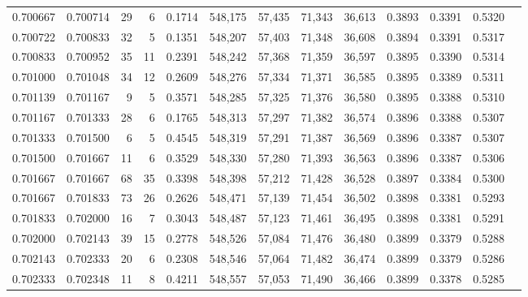 \begin{tabular}{rrrrrrrrrrrrr}
0.700667 & 0.700714 &    29 &   6 &                                     0.1714 & 548,175 &  57,435 &  71,343 &  36,613 & 0.3893 & 0.3391 & 0.5320 \\
0.700722 & 0.700833 &    32 &   5 &                                     0.1351 & 548,207 &  57,403 &  71,348 &  36,608 & 0.3894 & 0.3391 & 0.5317 \\
0.700833 & 0.700952 &    35 &  11 &                                     0.2391 & 548,242 &  57,368 &  71,359 &  36,597 & 0.3895 & 0.3390 & 0.5314 \\
0.701000 & 0.701048 &    34 &  12 &                                     0.2609 & 548,276 &  57,334 &  71,371 &  36,585 & 0.3895 & 0.3389 & 0.5311 \\
0.701139 & 0.701167 &     9 &   5 &                                     0.3571 & 548,285 &  57,325 &  71,376 &  36,580 & 0.3895 & 0.3388 & 0.5310 \\
0.701167 & 0.701333 &    28 &   6 &                                     0.1765 & 548,313 &  57,297 &  71,382 &  36,574 & 0.3896 & 0.3388 & 0.5307 \\
0.701333 & 0.701500 &     6 &   5 &                                     0.4545 & 548,319 &  57,291 &  71,387 &  36,569 & 0.3896 & 0.3387 & 0.5307 \\
0.701500 & 0.701667 &    11 &   6 &                                     0.3529 & 548,330 &  57,280 &  71,393 &  36,563 & 0.3896 & 0.3387 & 0.5306 \\
0.701667 & 0.701667 &    68 &  35 &                                     0.3398 & 548,398 &  57,212 &  71,428 &  36,528 & 0.3897 & 0.3384 & 0.5300 \\
0.701667 & 0.701833 &    73 &  26 &                                     0.2626 & 548,471 &  57,139 &  71,454 &  36,502 & 0.3898 & 0.3381 & 0.5293 \\
0.701833 & 0.702000 &    16 &   7 &                                     0.3043 & 548,487 &  57,123 &  71,461 &  36,495 & 0.3898 & 0.3381 & 0.5291 \\
0.702000 & 0.702143 &    39 &  15 &                                     0.2778 & 548,526 &  57,084 &  71,476 &  36,480 & 0.3899 & 0.3379 & 0.5288 \\
0.702143 & 0.702333 &    20 &   6 &                                     0.2308 & 548,546 &  57,064 &  71,482 &  36,474 & 0.3899 & 0.3379 & 0.5286 \\
0.702333 & 0.702348 &    11 &   8 &                                     0.4211 & 548,557 &  57,053 &  71,490 &  36,466 & 0.3899 & 0.3378 & 0.5285 \\

\end{tabular}
